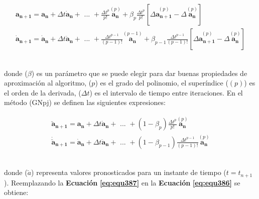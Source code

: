\begin{ceqn} 
\begin{subequations} \label{eq:equ386} 
\begin{gather}
\mathbf{a_{n+1}} = \mathbf{a_{n}} + \Delta t \mathbf{\dot{a}_n} + \text{ ... } + \frac{\Delta t^p}{p!}\overset{(p)}{\mathbf{a_{n}}} + \beta_p \frac{\Delta t^p}{p!}\left[\Delta \overset{(p)}{\mathbf{a_{n+1}}} - \Delta \overset{(p)}{\mathbf{a_{n}}} \right] \label{eq:equ386a}\\[12pt]
\mathbf{\dot{a}_{n+1}} = \mathbf{\dot{a}_{n}} + \Delta t \mathbf{\ddot{a}_n} + \text{ ... } + \frac{\Delta t^{p-1}}{(p-1)!}\overset{(p-1)}{\mathbf{a_{n}}} + \beta_{p-1} \frac{\Delta t^{p-1}}{(p-1)!} \left[\Delta \overset{(p)}{\mathbf{a_{n+1}}} - \Delta \overset{(p)}{\mathbf{a_{n}}} \right] \label{eq:equ386b}
\end{gather}  
\end{subequations} 
\end{ceqn}
\\
donde ($\beta$) es un parámetro que se puede elegir para dar buenas propiedades de aproximación al algoritmo, ($p$) es el grado del polinomio, el superíndice ($(p)$) es el orden de la derivada, ($\Delta t$) es el intervalo de tiempo entre iteraciones. En el método (GNpj) se definen las siguientes expresiones:

\begin{ceqn} 
\begin{subequations} \label{eq:equ387} 
\begin{gather}
\mathbf{\breve{a}_{n+1}} = \mathbf{a_{n}} + \Delta t \mathbf{\dot{a}_n} + \text{ ... } + (1-\beta_p) \frac{\Delta t^p}{p!} \overset{(p)}{\mathbf{a_{n}}}  \label{eq:equ387a}\\[12pt]
\mathbf{\dot{\breve{a}}_{n+1}} = \mathbf{\dot{a}_{n}} + \Delta t \mathbf{\ddot{a}_n} + \text{ ... } +  (1-\beta_{p-1}) \frac{\Delta t^{p-1}}{(p-1)!} \overset{(p)}{\mathbf{a_{n}}}  \label{eq:equ387b}
\end{gather}  
\end{subequations} 
\end{ceqn}
\\
donde ($\breve{a}$) representa valores pronosticados para un instante de tiempo ($t=t_{n+1}$). Reemplazando la \textbf{Ecuación} \textbf{\ref{eq:equ387}} en la \textbf{Ecuación} \textbf{\ref{eq:equ386}} se obtiene:

